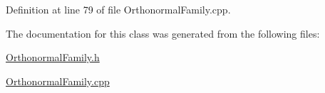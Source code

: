 Definition at line 79 of file Orthonormal\+Family.\+cpp.



The documentation for this class was generated from the following files\+:\begin{DoxyCompactItemize}
\item 
\hyperlink{OrthonormalFamily_8h}{Orthonormal\+Family.\+h}\item 
\hyperlink{OrthonormalFamily_8cpp}{Orthonormal\+Family.\+cpp}\end{DoxyCompactItemize}
